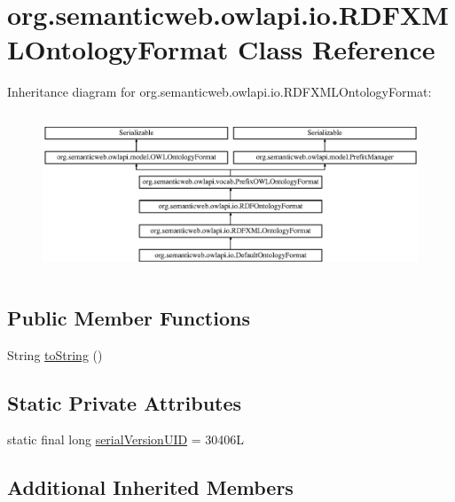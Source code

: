\hypertarget{classorg_1_1semanticweb_1_1owlapi_1_1io_1_1_r_d_f_x_m_l_ontology_format}{\section{org.\-semanticweb.\-owlapi.\-io.\-R\-D\-F\-X\-M\-L\-Ontology\-Format Class Reference}
\label{classorg_1_1semanticweb_1_1owlapi_1_1io_1_1_r_d_f_x_m_l_ontology_format}
}
Inheritance diagram for org.\-semanticweb.\-owlapi.\-io.\-R\-D\-F\-X\-M\-L\-Ontology\-Format\-:\begin{figure}[H]
\begin{center}
\leavevmode
\includegraphics[height=4.813753cm]{classorg_1_1semanticweb_1_1owlapi_1_1io_1_1_r_d_f_x_m_l_ontology_format}
\end{center}
\end{figure}
\subsection*{Public Member Functions}
\begin{DoxyCompactItemize}
\item 
String \hyperlink{classorg_1_1semanticweb_1_1owlapi_1_1io_1_1_r_d_f_x_m_l_ontology_format_ab29046bb48295c762a9a8dcec3d39f8c}{to\-String} ()
\end{DoxyCompactItemize}
\subsection*{Static Private Attributes}
\begin{DoxyCompactItemize}
\item 
static final long \hyperlink{classorg_1_1semanticweb_1_1owlapi_1_1io_1_1_r_d_f_x_m_l_ontology_format_afc6e9498d89882118b1603f275621457}{serial\-Version\-U\-I\-D} = 30406\-L
\end{DoxyCompactItemize}
\subsection*{Additional Inherited Members}


